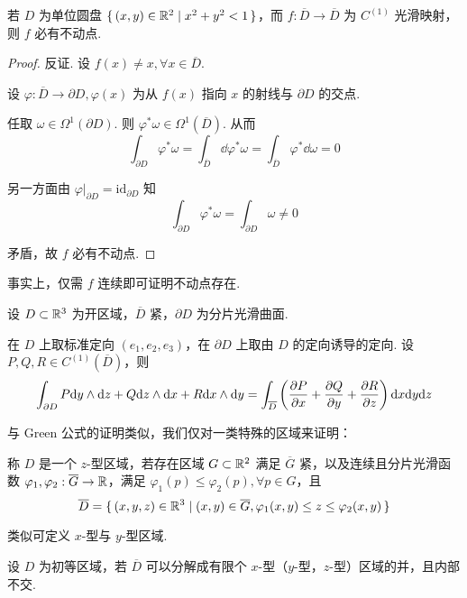 \begin{example}
    若 $D$ 为单位圆盘 $\set{(x,y)\in\mathbb{R}^2|x^2+y^2<1}$，而 $f:\overline{D}\to\overline{D}$ 为 $C^{(1)}$ 光滑映射，则 $f$ 必有不动点.
\end{example}
\begin{proof}
    反证. 设 $f(x)\ne x,\forall x\in\overline{D}$.

    设 $\varphi:\overline{D}\to\partial{D},\varphi(x)$ 为从 $f(x)$ 指向 $x$ 的射线与 $\partial D$ 的交点.
    
    任取 $\omega\in\Omega^1(\partial D)$. 则 $\varphi^*\omega\in\Omega^1(\overline{D})$. 从而
$$
\int_{\partial D}\varphi^*\omega=\int_{\overline{D}}\dd\varphi^*\omega=\int_{\overline{D}}\varphi^*\dd\omega=0
$$

    另一方面由 $\varphi|_{\partial D}=\mathrm{id}_{\partial D}$ 知
$$
\int_{\partial D}\varphi^*\omega=\int_{\partial D}\omega\ne 0
$$

    矛盾，故 $f$ 必有不动点.
\end{proof}

\begin{hint}
    事实上，仅需 $f$ 连续即可证明不动点存在.
\end{hint}


\begin{theorem}
    设 $D\subset\mathbb{R}^3$ 为开区域，$\overline{D}$ 紧，$\partial D$ 为分片光滑曲面.

    在 $D$ 上取标准定向 $(e_1,e_2,e_3)$，在 $\partial D$ 上取由 $D$ 的定向诱导的定向. 设 $P,Q,R\in C^{(1)}(\overline{D})$，则
$$
\int_{\partial D}P\mathrm{d} y\wedge\mathrm{d} z+Q\mathrm{d} z\wedge\mathrm{d} x+R\mathrm{d} x\wedge\mathrm{d} y=\int_{\overline{D}}\left(\frac{\partial{P}}{\partial{x}}+\frac{\partial{Q}}{\partial{y}}+\frac{\partial{R}}{\partial{z}}\right)\mathrm{d} x\mathrm{d} y\mathrm{d} z
$$
\end{theorem}

与 Green 公式的证明类似，我们仅对一类特殊的区域来证明：

\begin{definition}
    称 $D$ 是一个 $z$-型区域，若存在区域 $G\subset\mathbb{R}^2$ 满足 $\overline{G}$ 紧，以及连续且分片光滑函数 $\varphi_1,\varphi_2:\overline{G}\to\mathbb{R}$，满足 $\varphi_1(p)\le\varphi_2(p),\forall p\in G$，且
$$
\overline{D}=\set{(x,y,z)\in\mathbb{R}^3|(x,y)\in\overline{G},\varphi_1(x,y)\le z\le\varphi_2(x,y)}
$$
\end{definition}

类似可定义 $x$-型与 $y$-型区域.

\begin{definition}
    设 $D$ 为初等区域，若 $\overline{D}$ 可以分解成有限个 $x$-型（$y$-型，$z$-型）区域的并，且内部不交.
\end{definition}

